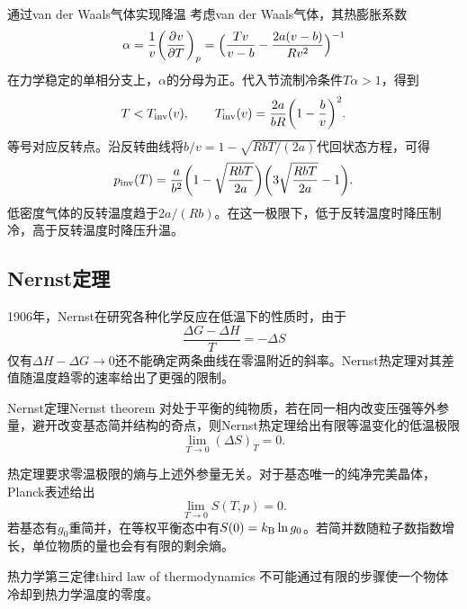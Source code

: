 \begin{example}
	{通过van der Waals气体实现降温}{}
	考虑van der Waals气体，其热膨胀系数
	\[
		\alpha = \frac1v\biggl(\frac{\partial^{}v}{\partial{T}^{}}\biggr)_{p} = \Bigl(\frac{Tv}{v - b} - \frac{2a(v - b)}{Rv^2}\Bigr)^{-1}
	\]
	在力学稳定的单相分支上，$\alpha$的分母为正。代入节流制冷条件$T\alpha > 1$，得到
	\begin{equation}
		\label{eq:sm-van-der-waals-inversion-temperature}
		T < T_{\mathrm{inv}}(v),\qquad
		T_{\mathrm{inv}}(v) = \frac{2a}{bR}\biggl(1 - \frac bv\biggr)^2.
	\end{equation}
	等号对应反转点。沿反转曲线将$b/v = 1 - \sqrt{RbT/(2a)}$代回状态方程，可得
	\begin{equation}
		\label{eq:sm-van-der-waals-inversion-curve}
		p_{\mathrm{inv}}(T) = \frac a{b^2}\biggl(1 - \sqrt{\frac{RbT}{2a}}\biggr)\biggl(3\sqrt{\frac{RbT}{2a}} - 1\biggr).
	\end{equation}
	低密度气体的反转温度趋于$2a/(Rb)$。在这一极限下，低于反转温度时降压制冷，高于反转温度时降压升温。
	\begin{notecaptionblock}
	\end{notecaptionblock}
\end{example}

\subsection{Nernst定理}

1906年，Nernst在研究各种化学反应在低温下的性质时，由于
\[
	\frac{\Delta G - \Delta H}T = -\Delta S
\]
仅有$\Delta H - \Delta G \to 0$还不能确定两条曲线在零温附近的斜率。Nernst热定理对其差值随温度趋零的速率给出了更强的限制。

\begin{theorem}
	{Nernst定理}{Nernst theorem}
	对处于平衡的纯物质，若在同一相内改变压强等外参量，避开改变基态简并结构的奇点，则Nernst热定理给出有限等温变化的低温极限
	\begin{equation}
		\lim_{T\to 0}(\Delta S)_T = 0.
	\end{equation}
\end{theorem}

\begin{corollary}
	热定理要求零温极限的熵与上述外参量无关。对于基态唯一的纯净完美晶体，Planck表述给出
	\begin{equation}
		\lim_{T\to 0}S(T,p) = 0.
	\end{equation}
	若基态有$g_0$重简并，在等权平衡态中有$S(0) = k_{\mathrm{B}}\ln g_0$。若简并数随粒子数指数增长，单位物质的量也会有有限的剩余熵。
\end{corollary}

\begin{theorem}
	{热力学第三定律}{third law of thermodynamics}
	不可能通过有限的步骤使一个物体冷却到热力学温度的零度。
\end{theorem}

